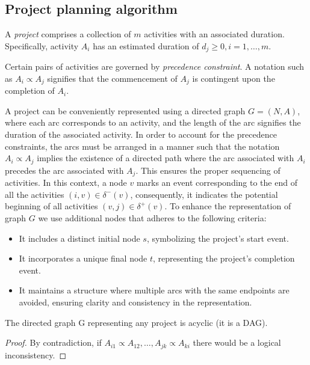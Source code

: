\documentclass[12pt, a4paper]{report}
\begin{document}
    \subsection{Project planning algorithm}
    \begin{definition}
        A \emph{project}  comprises a collection of $m$ activities with an associated duration. 
        Specifically, activity $A_i$ has an estimated duration of $d_j \geq 0, i=1,\dots,m$. 

        Certain pairs of activities are governed by \emph{precedence constraint}. 
        A notation such as $A_i \varpropto A_j$ signifies that the commencement of $A_j$ is contingent upon the completion of $A_i$. 
    \end{definition}
    A project can be conveniently represented using a directed graph $G = (N, A)$, where each arc corresponds to an activity, and the length of the arc signifies the duration of the associated activity.
    In order to account for the precedence constraints, the arcs must be arranged in a manner such that the notation $A_i \varpropto A_j$ implies the existence of a directed path where the arc associated with $A_i$ precedes the arc associated with $A_j$.
    This ensures the proper sequencing of activities.
    In this context, a node $v$ marks an event corresponding to the end of all the activities $(i,v) \in \delta^{-}(v)$, consequently, it indicates the potential beginning of all activities $(v,j) \in \delta^{+}(v)$. 
    To enhance the representation of graph $G$ we use additional nodes that adheres to the following criteria:
    \begin{itemize}
        \item It includes a distinct initial node $s$, symbolizing the project's start event.
        \item It incorporates a unique final node $t$, representing the project's completion event.
        \item It maintains a structure where multiple arcs with the same endpoints are avoided, ensuring clarity and consistency in the representation. 
    \end{itemize}
    \begin{property}
        The directed graph G representing any project is acyclic (it is a DAG). 
    \end{property}
    \begin{proof}
        By contradiction, if $A_{i1}\varpropto A_{12},\dots,A_{jk}\varpropto A_{ki}$ there would be a logical inconsistency. 
    \end{proof}  
\end{document}
